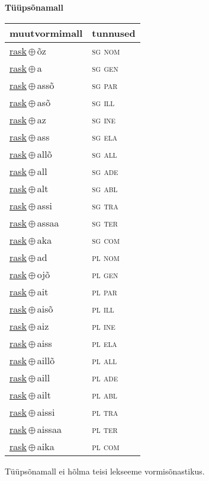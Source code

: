 

\vspace{3.5em}
\noindent \begin{minipage}{\textwidth}
\noindent \textbf{Tüüpsõnamall \,}\\

\begin{sideways}
\begin{tabular}{l l}
muutvormimall & tunnused \\
\hline
\underline{rask}\,$\oplus$\,õz & \textsc{ sg nom } \\
\underline{rask}\,$\oplus$\,a & \textsc{ sg gen } \\
\underline{rask}\,$\oplus$\,assõ & \textsc{ sg par } \\
\underline{rask}\,$\oplus$\,asõ & \textsc{ sg ill } \\
\underline{rask}\,$\oplus$\,az & \textsc{ sg ine } \\
\underline{rask}\,$\oplus$\,ass & \textsc{ sg ela } \\
\underline{rask}\,$\oplus$\,allõ & \textsc{ sg all } \\
\underline{rask}\,$\oplus$\,all & \textsc{ sg ade } \\
\underline{rask}\,$\oplus$\,alt & \textsc{ sg abl } \\
\underline{rask}\,$\oplus$\,assi & \textsc{ sg tra } \\
\underline{rask}\,$\oplus$\,assaa & \textsc{ sg ter } \\
\underline{rask}\,$\oplus$\,aka & \textsc{ sg com } \\
\underline{rask}\,$\oplus$\,ad & \textsc{ pl nom } \\
\underline{rask}\,$\oplus$\,ojõ & \textsc{ pl gen } \\
\underline{rask}\,$\oplus$\,ait & \textsc{ pl par } \\
\underline{rask}\,$\oplus$\,aisõ & \textsc{ pl ill } \\
\underline{rask}\,$\oplus$\,aiz & \textsc{ pl ine } \\
\underline{rask}\,$\oplus$\,aiss & \textsc{ pl ela } \\
\underline{rask}\,$\oplus$\,aillõ & \textsc{ pl all } \\
\underline{rask}\,$\oplus$\,aill & \textsc{ pl ade } \\
\underline{rask}\,$\oplus$\,ailt & \textsc{ pl abl } \\
\underline{rask}\,$\oplus$\,aissi & \textsc{ pl tra } \\
\underline{rask}\,$\oplus$\,aissaa & \textsc{ pl ter } \\
\underline{rask}\,$\oplus$\,aika & \textsc{ pl com } \\
\end{tabular}
\end{sideways}
\label{tab:tüüpsõnamall-raskõz}

\end{minipage}

 
\vspace{1em}
\noindent Tüüpsõnamall  ei hõlma teisi lekseeme vormi\-sõnastikus.
